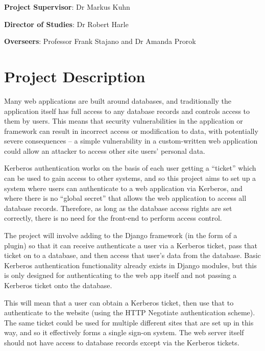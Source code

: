\documentclass{article}
\begin{document}
\maketitle

\textbf{Project Supervisor}: Dr Markus Kuhn

\textbf{Director of Studies}: Dr Robert Harle

\textbf{Overseers}: Professor Frank Stajano and Dr Amanda Prorok


\section*{Project Description}
Many web applications are built around databases, and traditionally the application itself has full access to any database records and controls access to them by users. This means that security vulnerabilities in the application or framework can result in incorrect access or modification to data, with potentially severe consequences -- a simple vulnerability in a custom-written web application could allow an attacker to access other site users’ personal data.

Kerberos authentication works on the basis of each user getting a ``ticket'' which can be used to gain access to other systems, and so this project aims to set up a system where users can authenticate to a web application via Kerberos, and where there is no ``global secret'' that allows the web application to access all database records. Therefore, as long as the database access rights are set correctly, there is no need for the front-end to perform access control.

The project will involve adding to the Django framework (in the form of a plugin) so that it can receive authenticate a user via a Kerberos ticket, pass that ticket on to a database, and then access that user’s data from the database. Basic Kerberos authentication functionality already exists in Django modules, but this is only designed for authenticating to the web app itself and not passing a Kerberos ticket onto the database.

This will mean that a user can obtain a Kerberos ticket, then use that to authenticate to the website (using the HTTP Negotiate authentication scheme). The same ticket could be used for multiple different sites that are set up in this way, and so it effectively forms a single sign-on system. The web server itself should not have access to database records except via the Kerberos tickets.
\end{document}
